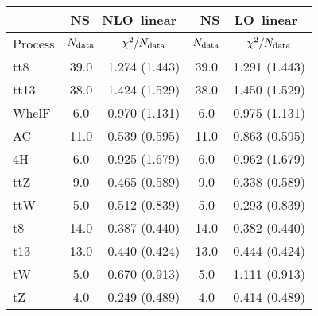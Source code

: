 \documentclass{article}
\begin{document}
\begin{table}[H]
\centering
\begin{tabular}{|l|c|c|c|c|}
\hline
& \multicolumn{2}{c|}{\rm NS \ NLO\ linear}& \multicolumn{2}{c|}{\rm NS\ \ LO\ linear}\\ \hline
Process  & $N_{\rm data}$ & $\chi^2/N_{\rm data}$ & $N_{\rm data}$ & $\chi^2/N_{\rm data}$\\ \hline
tt8 & 39.0                         & 1.274                             (1.443) & 39.0                         & 1.291                             (1.443) \\ \hline
tt13 & 38.0                         & 1.424                             (1.529) & 38.0                         & 1.450                             (1.529) \\ \hline
WhelF & 6.0                         & 0.970                             (1.131) & 6.0                         & 0.975                             (1.131) \\ \hline
AC & 11.0                         & 0.539                             (0.595) & 11.0                         & 0.863                             (0.595) \\ \hline
4H & 6.0                         & 0.925                             (1.679) & 6.0                         & 0.962                             (1.679) \\ \hline
ttZ & 9.0                         & 0.465                             (0.589) & 9.0                         & 0.338                             (0.589) \\ \hline
ttW & 5.0                         & 0.512                             (0.839) & 5.0                         & 0.293                             (0.839) \\ \hline
t8 & 14.0                         & 0.387                             (0.440) & 14.0                         & 0.382                             (0.440) \\ \hline
t13 & 13.0                         & 0.440                             (0.424) & 13.0                         & 0.444                             (0.424) \\ \hline
tW & 5.0                         & 0.670                             (0.913) & 5.0                         & 1.111                             (0.913) \\ \hline
tZ & 4.0                         & 0.249                             (0.489) & 4.0                         & 0.414                             (0.489) \\ \hline

\end{tabular}
\end{table}
\end{document}
